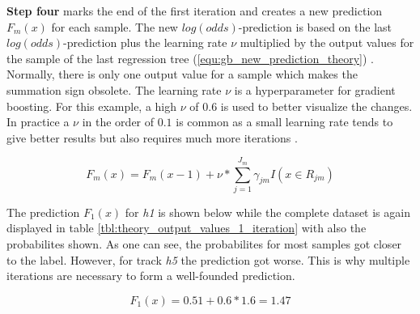 \textbf{Step four} marks the end of the first iteration and creates a new prediction \(F_{m}(x)\) for each sample. 
The new \(log(odds)\)-prediction is based on the last \(log(odds)\)-prediction plus the learning rate \(\nu\) multiplied by 
the output values for the sample of the last regression tree (\ref{equ:gb_new_prediction_theory}) \cite[p.1203]{Friedman_2001}. Normally, there is only one 
output value for a sample which makes the summation sign obsolete. The learning rate \(\nu\) is a 
hyperparameter for gradient boosting. For this example, a high \(\nu\) of \(0.6\) is used to better visualize 
the changes. In practice a \(\nu \) in the order of \(0.1\) is common as a small learning rate tends to
give better results but also requires much more iterations \cite[p.1206]{Friedman_2001}. 

\begin{equation}
    F_{m}(x) = F_{m}(x- 1) + \nu * \sum_{j = 1}^{J_{m}} \gamma_{jm}I(x \in R_{jm})
    \label{equ:gb_new_prediction_theory}
\end{equation}

The prediction \(F_{1}(x)\) for \emph{h1} is shown below while the complete dataset is again displayed in table \ref{tbl:theory_output_values_1_iteration} with also 
the probabilites shown. As one can see, the probabilites for most samples got closer to the label. However, for track
\emph{h5} the prediction got worse. This is why multiple iterations are necessary to form a well-founded prediction.

\begin{equation*}
F_{1}(x) = 0.51 + 0.6 * 1.6 = 1.47
\end{equation*}


